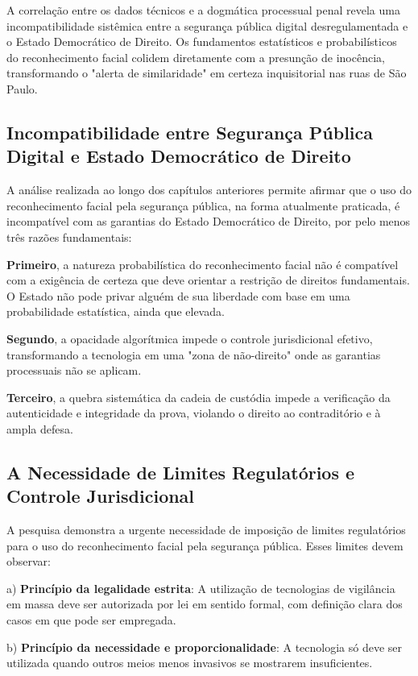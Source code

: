 \documentclass[12pt,a4paper]{article}
\begin{document}
A correlação entre os dados técnicos e a dogmática processual penal revela uma incompatibilidade sistêmica entre a segurança pública digital desregulamentada e o Estado Democrático de Direito. Os fundamentos estatísticos e probabilísticos do reconhecimento facial colidem diretamente com a presunção de inocência, transformando o "alerta de similaridade" em certeza inquisitorial nas ruas de São Paulo.

\subsection{Incompatibilidade entre Segurança Pública Digital e Estado Democrático de Direito}

A análise realizada ao longo dos capítulos anteriores permite afirmar que o uso do reconhecimento facial pela segurança pública, na forma atualmente praticada, é incompatível com as garantias do Estado Democrático de Direito, por pelo menos três razões fundamentais:

\textbf{Primeiro}, a natureza probabilística do reconhecimento facial não é compatível com a exigência de certeza que deve orientar a restrição de direitos fundamentais. O Estado não pode privar alguém de sua liberdade com base em uma probabilidade estatística, ainda que elevada.

\textbf{Segundo}, a opacidade algorítmica impede o controle jurisdicional efetivo, transformando a tecnologia em uma "zona de não-direito" onde as garantias processuais não se aplicam.

\textbf{Terceiro}, a quebra sistemática da cadeia de custódia impede a verificação da autenticidade e integridade da prova, violando o direito ao contraditório e à ampla defesa.

\subsection{A Necessidade de Limites Regulatórios e Controle Jurisdicional}

A pesquisa demonstra a urgente necessidade de imposição de limites regulatórios para o uso do reconhecimento facial pela segurança pública. Esses limites devem observar:

a) \textbf{Princípio da legalidade estrita}: A utilização de tecnologias de vigilância em massa deve ser autorizada por lei em sentido formal, com definição clara dos casos em que pode ser empregada.

b) \textbf{Princípio da necessidade e proporcionalidade}: A tecnologia só deve ser utilizada quando outros meios menos invasivos se mostrarem insuficientes.
\end{document}

